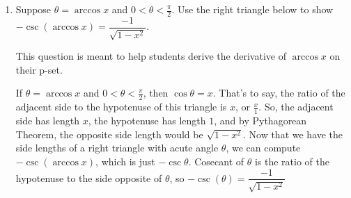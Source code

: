 \documentclass{article}
\begin{document}
\begin{enumerate}
\begin{enumerate}
\begin{solution}

\end{solution}
     \vfill \vfill
\end{enumerate}
\item 
Suppose $\theta=\arccos x$ and $0<\theta<\frac{\pi}{2}$. Use the right triangle below to show $-\csc(\arccos x)=\dfrac{-1}{\sqrt{1-x^2}}$. 
\begin{workshop}
    This question is meant to help students derive the derivative of $\arccos x$ on their p-set.
\end{workshop}
\vspace{1cm}
     
     \begin{solution}
     If $\theta=\arccos x$ and $0<\theta<\frac{\pi}{2}$, then $\cos \theta = x$. That's to say, the ratio of the adjacent side to the hypotenuse of this triangle is $x$, or $\frac{x}{1}$. So, the adjacent side has length $x$, the hypotenuse has length $1$, and by Pythagorean Theorem, the opposite side length would be $\sqrt{1-x^2}$. Now that we have the side lengths of a right triangle with acute angle $\theta$, we can compute $-\csc(\arccos x)$, which is just $-\csc\theta$. Cosecant of $\theta$ is the ratio of the hypotenuse to the side opposite of $\theta$, so $-\csc(\theta)=\dfrac{-1}{\sqrt{1-x^2}}$
     \end{solution}
   \end{enumerate}
   
\end{document}
